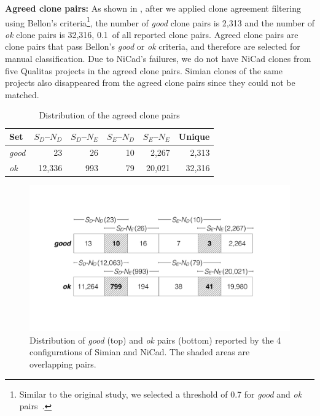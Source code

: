 \documentclass[sigconf,review, anonymous]{acmart}
\begin{document}
\textbf{Agreed clone pairs: } As shown in , after we applied clone
agreement filtering using Bellon's criteria\footnote{Similar to the
  original study, we selected a threshold of 0.7 for
  \textit{good} and \textit{ok} pairs~\cite{Bellon2007}.}, the number
of \textit{good} clone pairs is 2,313 and the number of \textit{ok}
clone pairs is 32,316, 0.1\textperthousand~of all reported clone
pairs.  Agreed clone pairs are clone pairs that pass Bellon's
\textit{good} or \textit{ok} criteria, and therefore are selected for
manual classification.  Due to NiCad's failures, we do not have NiCad
clones from five Qualitas projects in the agreed clone pairs. Simian
clones of the same projects also disappeared from the agreed clone
pairs since they could not be matched.

\begin{table}
  \centering
  \caption{Distribution of the agreed clone pairs}
  \label{t_agreed_good_clone_pairs}
  \begin{tabular}{l|r|r|r|r|r}
    \hline
    Set & $S_D$--$N_D$ & $S_D$--$N_E$ & $S_E$--$N_D$ & $S_E$--$N_E$ & Unique \\
    \hline
    \textit{good} & 23 & 26 & 10 & 2,267 & 2,313 \\
    \textit{ok} & 12,336 & 993 & 79 & 20,021 & 32,316 \\
    \hline
  \end{tabular} %
\end{table}

\begin{figure}
	\centering
	\includegraphics[width=0.9\linewidth]{good-ok_pairs}
	\caption{Distribution of \textit{good} (top) and \textit{ok} pairs (bottom) reported by the 4 configurations of Simian and NiCad. The shaded areas are overlapping pairs.}
	\label{fig:good-ok-pairs}
\end{figure}
\end{document}
